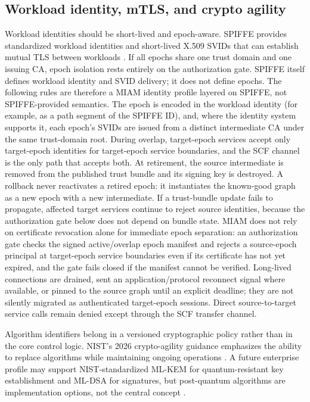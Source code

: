 \documentclass[11pt,letterpaper]{article}
\begin{document}
\subsection{Workload identity, mTLS, and crypto agility}

Workload identities should be short-lived and epoch-aware. SPIFFE provides standardized workload identities and short-lived X.509 SVIDs that can establish mutual TLS between workloads \cite{spiffe}. If all epochs share one trust domain and one issuing CA, epoch isolation rests entirely on the authorization gate. SPIFFE itself defines workload identity and SVID delivery; it does not define epochs. The following rules are therefore a MIAM identity profile layered on SPIFFE, not SPIFFE-provided semantics. The epoch is encoded in the workload identity (for example, as a path segment of the SPIFFE ID), and, where the identity system supports it, each epoch's SVIDs are issued from a distinct intermediate CA under the same trust-domain root. During overlap, target-epoch services accept only target-epoch identities for target-epoch service boundaries, and the SCF channel is the only path that accepts both. At retirement, the source intermediate is removed from the published trust bundle and its signing key is destroyed. A rollback never reactivates a retired epoch: it instantiates the known-good graph as a new epoch with a new intermediate. If a trust-bundle update fails to propagate, affected target services continue to reject source identities, because the authorization gate below does not depend on bundle state. MIAM does not rely on certificate revocation alone for immediate epoch separation: an authorization gate checks the signed active/overlap epoch manifest and rejects a source-epoch principal at target-epoch service boundaries even if its certificate has not yet expired, and the gate fails closed if the manifest cannot be verified. Long-lived connections are drained, sent an application/protocol reconnect signal where available, or pinned to the source graph until an explicit deadline; they are not silently migrated as authenticated target-epoch sessions. Direct source-to-target service calls remain denied except through the SCF transfer channel.

Algorithm identifiers belong in a versioned cryptographic policy rather than in the core control logic. NIST's 2026 crypto-agility guidance emphasizes the ability to replace algorithms while maintaining ongoing operations \cite{nistcswp39}. A future enterprise profile may support NIST-standardized ML-KEM for quantum-resistant key establishment and ML-DSA for signatures, but post-quantum algorithms are implementation options, not the central concept \cite{fips203,fips204}.
\end{document}
